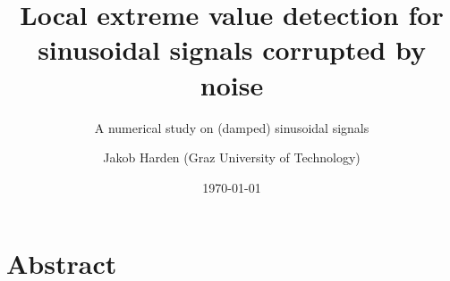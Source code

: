 \documentclass[11pt,aspectratio=169]{beamer}
\def\PresTitle{Local extreme value detection for sinusoidal signals corrupted by noise}
\def\PresSubTitle{A numerical study on (damped) sinusoidal signals}
\def\PresDate{\today}
\def\PresAuthorFirstname{Jakob}
\def\PresAuthorLastname{Harden}
\def\PresAuthor{\PresAuthorFirstname{} \PresAuthorLastname{}}
\def\PresAuthorAffiliation{Graz University of Technology}
\begin{document}
	\author{\PresAuthor{} (\PresAuthorAffiliation{})}
	\title{\PresTitle{}}
	\subtitle{\PresSubTitle{}}
	\date{\PresDate{}}
	\begin{frame}[plain]
		\maketitle
	\end{frame}
	\section*{Abstract}
\end{document}
